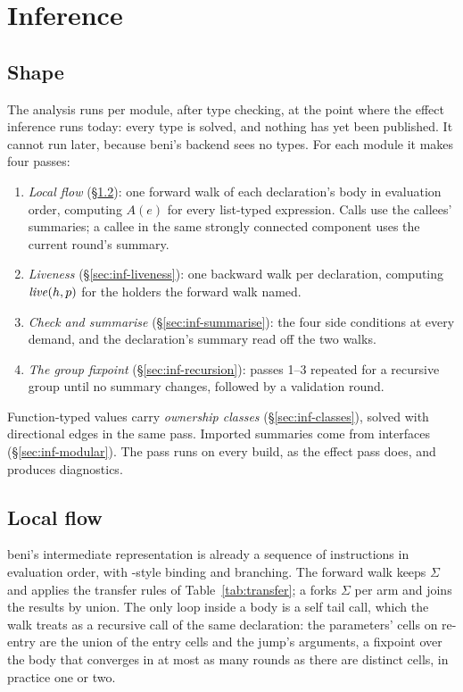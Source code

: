 \section{Inference}
\label{sec:inference}

\subsection{Shape}
\label{sec:inf-shape}

The analysis runs per module, after type checking, at the point where the effect inference runs
today: every type is solved, and nothing has yet been published. It cannot run later, because
beni's backend sees no types. For each module it makes four passes:

\begin{enumerate}
\item \emph{Local flow} (\S\ref{sec:inf-flow}): one forward walk of each declaration's body in
evaluation order, computing $A(e)$ for every list-typed expression. Calls use the callees' summaries;
a callee in the same strongly connected component uses the current round's summary.
\item \emph{Liveness} (\S\ref{sec:inf-liveness}): one backward walk per declaration, computing
$\mathit{live}(h, p)$ for the holders the forward walk named.
\item \emph{Check and summarise} (\S\ref{sec:inf-summarise}): the four side conditions at every
demand, and the declaration's summary read off the two walks.
\item \emph{The group fixpoint} (\S\ref{sec:inf-recursion}): passes 1--3 repeated for a recursive
group until no summary changes, followed by a validation round.
\end{enumerate}

Function-typed values carry \emph{ownership classes} (\S\ref{sec:inf-classes}), solved with
directional edges in the same pass. Imported summaries come from interfaces
(\S\ref{sec:inf-modular}). The pass runs on every build, as the effect pass does, and produces
diagnostics.

\subsection{Local flow}
\label{sec:inf-flow}

beni's intermediate representation is already a sequence of instructions in evaluation order, with
-style binding and  branching. The forward walk keeps $\Sigma$ and applies the
transfer rules of Table~\ref{tab:transfer}; a  forks $\Sigma$ per arm and joins the
results by union. The only loop inside a body is a self tail call, which the walk treats as a
recursive call of the same declaration: the parameters' cells on re-entry are the union of the entry
cells and the jump's arguments, a fixpoint over the body that converges in at most as many rounds as
there are distinct cells, in practice one or two.

